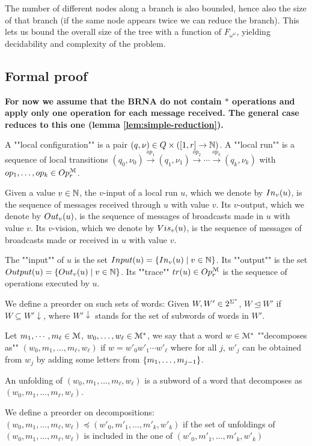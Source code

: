  The number of different nodes along a branch is also bounded, hence also the size of that branch (if the same node appears twice we can reduce the branch).
 This lets us bound the overall size of the tree with a function of $F_{\omega^\omega}$, yielding decidability and complexity of the problem.

\subsection{Formal proof}
\fi


\textbf{For now we assume that the BRNA do not contain $*$ operations and apply only one operation for each message received. The general case reduces to this one (lemma \ref{lem:simple-reduction}).}

\begin{definition}
	A ""local configuration"" is a pair $(q, \nu) \in Q \times ([1,r] \to \mathbb{N})$.
	A ""local run"" is a sequence of local transitions $(q_0, \nu_0) \xrightarrow{op_1} (q_1, \nu_1) \xrightarrow{op_2} \cdots \xrightarrow{op_k} (q_k, \nu_k)$ with $op_1, \ldots, op_k \in Op_r^{\mathcal{M}}$.
	
	Given a value $v \in \mathbb{N}$, the $v$-input of a local run $u$, which we denote by $In_{v}(u)$, is the sequence of messages received through $u$ with value $v$.
	Its $v$-output, which we denote by $Out_{v}(u)$, is the sequence of messages of broadcasts made in $u$ with value $v$. 
	Its $v$-vision, which we denote by $Vis_{v}(u)$, is the sequence of messages of broadcasts made or received in $u$ with value $v$.
	
	The ""input"" of $u$ is the set $Input(u) = \{In_{v}(u) \mid v \in \mathbb{N}\}$.
	Its ""output"" is the set $Output(u)=\{Out_{v}(u) \mid v \in \mathbb{N}\}$.
	Its ""trace"" $tr(u) \in Op^{\mathcal{M}}_r$ is the sequence of operations executed by $u$.
	
	We define a preorder on such sets of words:
	Given $W, W' \in 2^{\Sigma^*}$, $W \unlhd W'$ if $W \subseteq W'\downarrow$, where $W'\downarrow$ stands for the set of subwords of words in $W'$.
\end{definition}



\begin{definition}
	Let $m_1, \cdots, m_\ell \in \mathcal{M}$, $w_0, \ldots, w_\ell \in \mathcal{M}^*$, we say that a word $w \in \mathcal{M}^*$ ""decomposes as"" $(w_0, m_1, \ldots, m_\ell, w_\ell)$ if $w = w'_0 w'_1 \cdots w'_\ell$ where for all $j$, $w'_j$ can be obtained from $w_j$ by adding some letters from $\{m_1, \ldots, m_{j-1}\}$.
	
	An unfolding of $(w_0, m_1, \ldots, m_\ell, w_\ell)$ is a subword of a word that decomposes as $(w_0, m_1, \ldots, m_\ell, w_\ell)$. 
	
	We define a preorder on decompositions:
	$(w_0, m_1, \ldots, m_\ell, w_\ell) \preceq (w'_0, m'_1, \ldots, m'_k, w'_k)$ if the set of unfoldings of $(w_0, m_1, \ldots, m_\ell, w_\ell)$ is included in the one of $(w'_0, m'_1, \ldots, m'_k, w'_k)$
\end{definition}


